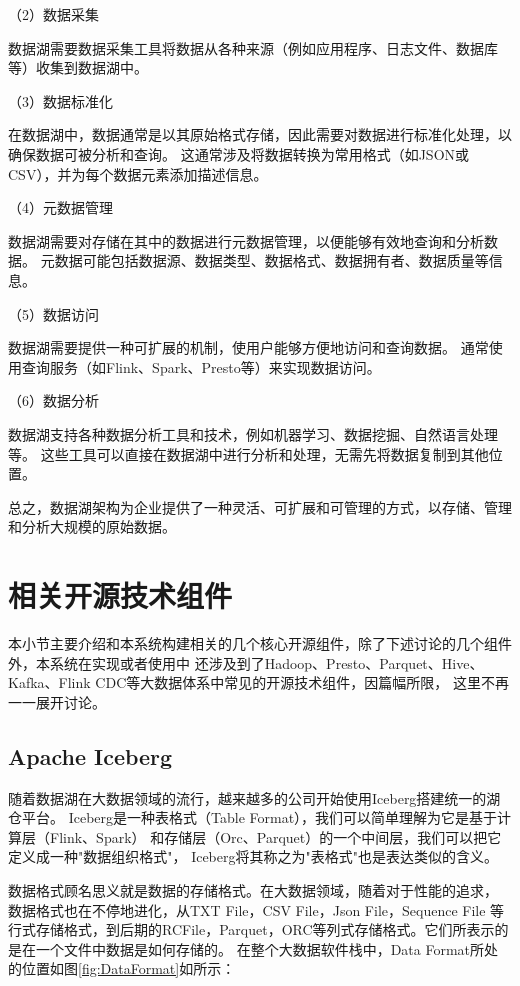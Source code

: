（2）数据采集

数据湖需要数据采集工具将数据从各种来源（例如应用程序、日志文件、数据库等）收集到数据湖中。

（3）数据标准化

在数据湖中，数据通常是以其原始格式存储，因此需要对数据进行标准化处理，以确保数据可被分析和查询。
这通常涉及将数据转换为常用格式（如JSON或CSV），并为每个数据元素添加描述信息。

（4）元数据管理

数据湖需要对存储在其中的数据进行元数据管理，以便能够有效地查询和分析数据。
元数据可能包括数据源、数据类型、数据格式、数据拥有者、数据质量等信息。

（5）数据访问

数据湖需要提供一种可扩展的机制，使用户能够方便地访问和查询数据。
通常使用查询服务（如Flink、Spark、Presto等）来实现数据访问。

（6）数据分析

数据湖支持各种数据分析工具和技术，例如机器学习、数据挖掘、自然语言处理等。
这些工具可以直接在数据湖中进行分析和处理，无需先将数据复制到其他位置。

总之，数据湖架构为企业提供了一种灵活、可扩展和可管理的方式，以存储、管理和分析大规模的原始数据。

\section{相关开源技术组件}

本小节主要介绍和本系统构建相关的几个核心开源组件，除了下述讨论的几个组件外，本系统在实现或者使用中
还涉及到了Hadoop、Presto、Parquet、Hive、Kafka、Flink CDC等大数据体系中常见的开源技术组件，因篇幅所限，
这里不再一一展开讨论。

\subsection{Apache Iceberg}

随着数据湖在大数据领域的流行，越来越多的公司开始使用Iceberg搭建统一的湖仓平台。
Iceberg是一种表格式（Table Format），我们可以简单理解为它是基于计算层（Flink、Spark）
和存储层（Orc\cite{9}、Parquet\cite{10}）的一个中间层，我们可以把它定义成一种"数据组织格式"，
Iceberg将其称之为"表格式"也是表达类似的含义。

数据格式顾名思义就是数据的存储格式。在大数据领域，随着对于性能的追求，
数据格式也在不停地进化，从TXT File，CSV File，Json File，Sequence File
等行式存储格式，到后期的RCFile，Parquet，ORC等列式存储格式。它们所表示的是在一个文件中数据是如何存储的。
在整个大数据软件栈中，Data Format所处的位置如图\ref{fig:DataFormat}如所示：

